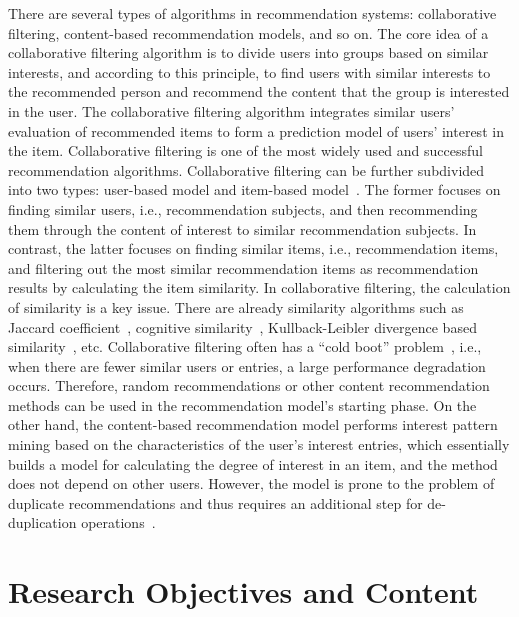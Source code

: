 There are several types of algorithms in recommendation systems: collaborative filtering, content-based recommendation models, and so on. The core idea of a collaborative filtering algorithm is to divide users into groups based on similar interests, and according to this principle, to find users with similar interests to the recommended person and recommend the content that the group is interested in the user. The collaborative filtering algorithm integrates similar users' evaluation of recommended items to form a prediction model of users' interest in the item. Collaborative filtering is one of the most widely used and successful recommendation algorithms. Collaborative filtering can be further subdivided into two types: user-based model and item-based model~\cite{Juan_2019}. The former focuses on finding similar users, i.e., recommendation subjects, and then recommending them through the content of interest to similar recommendation subjects. In contrast, the latter focuses on finding similar items, i.e., recommendation items, and filtering out the most similar recommendation items as recommendation results by calculating the item similarity. In collaborative filtering, the calculation of similarity is a key issue. There are already similarity algorithms such as Jaccard coefficient~\cite{leeJ2020accardcf}, cognitive similarity~\cite{cogsim2020}, Kullback-Leibler divergence based similarity~\cite{kldsim2019}, etc. Collaborative filtering often has a ``cold boot'' problem~\cite{fu2019collaborative}, i.e., when there are fewer similar users or entries, a large performance degradation occurs. Therefore, random recommendations or other content recommendation methods can be used in the recommendation model's starting phase. On the other hand, the content-based recommendation model performs interest pattern mining based on the characteristics of the user's interest entries, which essentially builds a model for calculating the degree of interest in an item, and the method does not depend on other users. However, the model is prone to the problem of duplicate recommendations and thus requires an additional step for de-duplication operations~\cite{gopalan2014content}.

\section{Research Objectives and Content}  %

